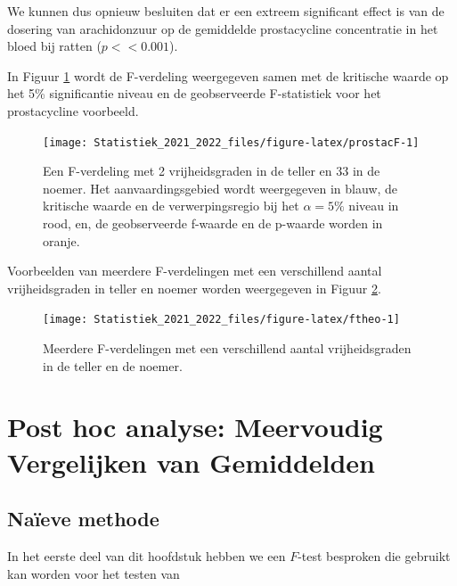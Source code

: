 \documentclass[
  12pt,dutch,coursenotes]{book}
\theoremstyle{definition}
\theoremstyle{definition}
\theoremstyle{definition}
\theoremstyle{definition}
\theoremstyle{remark}
\begin{document}
We kunnen dus opnieuw besluiten dat er een extreem significant effect is van de dosering van arachidonzuur op de gemiddelde prostacycline concentratie in het bloed bij ratten (\(p<<0.001\)).

In Figuur \ref{fig:prostacF} wordt de F-verdeling weergegeven samen met de kritische waarde op het 5\% significantie niveau en de geobserveerde F-statistiek voor het prostacycline voorbeeld.\\

\begin{figure}

{\centering \texttt{[image: Statistiek\_2021\_2022\_files/figure-latex/prostacF-1]} 

}

\caption{Een F-verdeling met 2 vrijheidsgraden in de teller en 33 in de noemer. Het aanvaardingsgebied wordt weergegeven in blauw, de kritische waarde en de verwerpingsregio bij het $\alpha=5\%$ niveau in rood, en, de geobserveerde f-waarde  en de p-waarde worden in oranje.}\label{fig:prostacF}
\end{figure}

Voorbeelden van meerdere F-verdelingen met een verschillend aantal vrijheidsgraden in teller en noemer worden weergegeven in Figuur \ref{fig:ftheo}.

\begin{figure}

{\centering \texttt{[image: Statistiek\_2021\_2022\_files/figure-latex/ftheo-1]} 

}

\caption{Meerdere F-verdelingen met een verschillend aantal vrijheidsgraden in de teller en de noemer.}\label{fig:ftheo}
\end{figure}

\hypertarget{post-hoc-analyse-meervoudig-vergelijken-van-gemiddelden}{%
\section{Post hoc analyse: Meervoudig Vergelijken van Gemiddelden}\label{post-hoc-analyse-meervoudig-vergelijken-van-gemiddelden}}

\hypertarget{nauxefeve-methode}{%
\subsection{Naïeve methode}\label{nauxefeve-methode}}

In het eerste deel van dit hoofdstuk hebben we een \(F\)-test besproken die gebruikt kan worden voor het testen van
\end{document}
